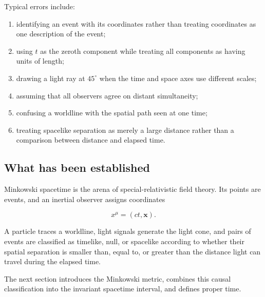 Typical errors include:

\begin{enumerate}
    \item identifying an event with its coordinates rather than treating coordinates as one description of the event;
    \item using \(t\) as the zeroth component while treating all components as having units of length;
    \item drawing a light ray at \(45^{\circ}\) when the time and space axes use different scales;
    \item assuming that all observers agree on distant simultaneity;
    \item confusing a worldline with the spatial path seen at one time;
    \item treating spacelike separation as merely a large distance rather than a comparison between distance and elapsed time.
\end{enumerate}

\subsection{What has been established}

Minkowski spacetime is the arena of special-relativistic field theory. Its points are events, and an inertial observer assigns coordinates

\[
x^{\mu}=(ct,\mathbf{x}).
\]

A particle traces a worldline, light signals generate the light cone, and pairs of events are classified as timelike, null, or spacelike according to whether their spatial separation is smaller than, equal to, or greater than the distance light can travel during the elapsed time.

The next section introduces the Minkowski metric, combines this causal classification into the invariant spacetime interval, and defines proper time.